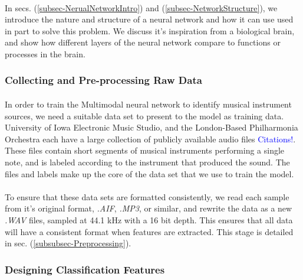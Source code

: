 \documentclass[12pt,letterpaper]{article}
\begin{document}
\paragraph*{}In secs. (\ref{subsec-NerualNetworkIntro}) and (\ref{subsec-NetworkStructure}), we introduce the nature and structure of a neural network and how it can use used in part to solve this problem. We discuss it's inspiration from a biological brain, and show how different layers of the neural network compare to functions or processes in the brain.


\subsubsection{Collecting and Pre-processing Raw Data}

\paragraph*{}In order to train the Multimodal neural network to identify musical instrument sources, we need a suitable data set to present to the model as training data. University of Iowa Electronic Music Studio, and the London-Based Philharmonia Orchestra each have a large collection of publicly available audio files \textcolor{blue}{Citations!}. These files contain short segments of musical instruments performing a single note, and is labeled according to the instrument that produced the sound. The files and labels make up the core of the data set that we use to train the model.

\paragraph*{}To ensure that these data sets are formatted consistently, we read each sample from it's original format, \textit{.AIF}, \textit{.MP3}, or similar, and rewrite the data as a new \textit{.WAV} files, sampled at 44.1 kHz with a 16 bit depth. This ensures that all data will have a consistent format when features are extracted. This stage is detailed in sec. (\ref{subsubsec-Preprocessing}).


\subsubsection{Designing Classification Features}
\end{document}
